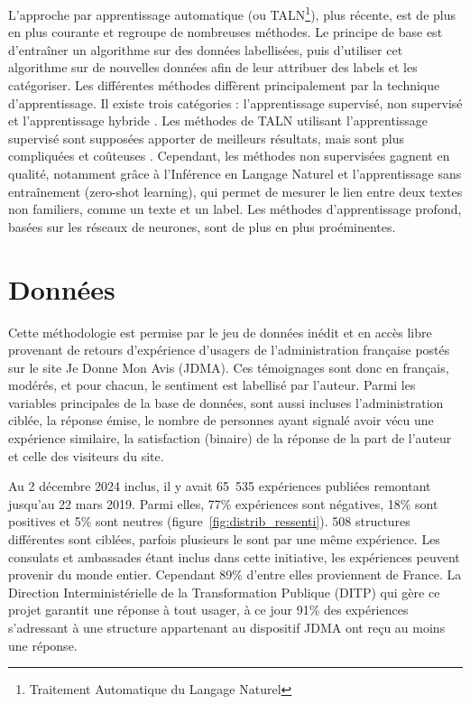 \documentclass[a4paper,12pt, openany]{book}
\begin{document}
L'approche par apprentissage automatique (ou TALN\footnote{Traitement Automatique du Langage Naturel}), plus récente, est de plus en plus courante et regroupe de nombreuses méthodes. Le principe de base est d'entraîner un algorithme sur des données labellisées, puis d'utiliser cet algorithme sur de nouvelles données afin de leur attribuer des labels et les catégoriser. Les différentes méthodes diffèrent principalement par la technique d'apprentissage. Il existe trois catégories : l'apprentissage supervisé, non supervisé et l'apprentissage hybride \parencite{ligthart21}. Les méthodes de TALN utilisant l'apprentissage supervisé sont supposées apporter de meilleurs résultats, mais sont plus compliquées et coûteuses \parencite{hemmatian19}. Cependant, les méthodes non supervisées gagnent en qualité, notamment grâce à l'Inférence en Langage Naturel et l'apprentissage sans entraînement (zero-shot learning), qui permet de mesurer le lien entre deux textes non familiers, comme un texte et un label. Les méthodes d'apprentissage profond, basées sur les réseaux de neurones, sont de plus en plus proéminentes. \par

\section{Données}
Cette méthodologie est permise par le jeu de données inédit et en accès libre provenant de retours d'expérience d'usagers de l'administration française postés sur le site Je Donne Mon Avis (JDMA). Ces témoignages sont donc en français, modérés, et pour chacun, le sentiment est labellisé par l'auteur. Parmi les variables principales de la base de données, sont aussi incluses l'administration ciblée, la réponse émise, le nombre de personnes ayant signalé avoir vécu une expérience similaire, la satisfaction (binaire) de la réponse de la part de l'auteur et celle des visiteurs du site. \par

Au 2 décembre 2024 inclus, il y avait 65~535 expériences publiées remontant jusqu'au 22 mars 2019. Parmi elles, 77\% expériences sont négatives, 18\% sont positives et 5\% sont neutres (figure~\ref{fig:distrib_ressenti}). 508 structures différentes sont ciblées, parfois plusieurs le sont par une même expérience. Les consulats et ambassades étant inclus dans cette initiative, les expériences peuvent provenir du monde entier. Cependant 89\% d'entre elles proviennent de France. La Direction Interministérielle de la Transformation Publique (DITP) qui gère ce projet garantit une réponse à tout usager, à ce jour 91\% des expériences s'adressant à une structure appartenant au dispositif JDMA ont reçu au moins une réponse. \par
\end{document}
